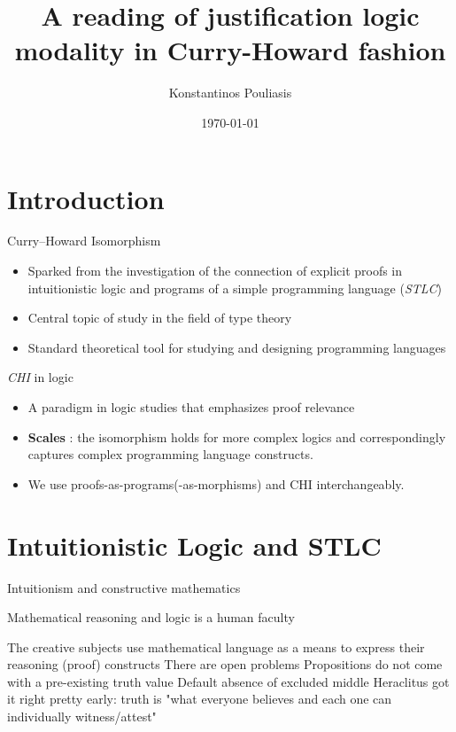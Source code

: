 \documentclass{beamer}
\title{A reading of justification logic modality in Curry-Howard fashion}
\date{\today}
\author{Konstantinos Pouliasis}
\institute{CUNY, Graduate Center}
\begin{document}
    \maketitle
    \section{Introduction}
    \begin{frame}{Curry--Howard Isomorphism}
      \begin{itemize}
\item[] Sparked from the investigation of the connection of 
explicit proofs in intuitionistic logic and 
programs of a simple programming language (\emph{STLC})

\item[] Central topic of study in the field of type theory

\item[] Standard theoretical tool for studying and designing programming languages
      \end{itemize}
\end{frame}
\begin{frame}{\emph{CHI} in logic}
  \begin{itemize}

  \item[] A  paradigm in logic studies that emphasizes proof relevance

  \item[] \textbf{Scales} : the isomorphism holds for more complex logics and correspondingly captures complex programming language constructs.

  \item[] We use proofs-as-programs(-as-morphisms) and CHI interchangeably.
  \end{itemize}
\end{frame}
\section{Intuitionistic Logic and STLC}
\begin{frame}{Intuitionism and constructive mathematics}
  \begin{outline}
    
    
  
  \1[] Mathematical reasoning and logic is a human faculty
  
  \2[!] The creative subjects use mathematical language 
  as a means to express their reasoning (proof) constructs
  \2[!] 
  There are open problems
  \2[!] 
  Propositions do not come with a pre-existing truth value
  \3[!!] 
  Default absence of excluded middle
  \1[] Heraclitus got it right pretty early: truth is  "what everyone believes and each one can individually witness/attest"
\end{outline}
\end{frame}
\end{document}
